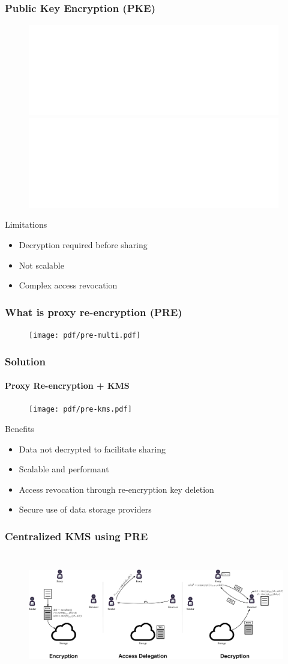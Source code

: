 \documentclass[xetex,mathsans,sans,aspectratio=169]{beamer}
\begin{document}
    \begin{frame}
        \frametitle{Public Key Encryption (PKE)}
        \begin{figure}
            \centering
            \includegraphics<1>[width=11cm]{pdf/pke-multi.pdf}
            \includegraphics<2>[width=11cm]{pdf/pke-multi-hack.pdf}
        \end{figure}

        Limitations
        \begin{itemize}
            \item Decryption required before sharing
            \item Not scalable
            \item Complex access revocation
        \end{itemize}
    \end{frame}

    \begin{frame}
        \frametitle{What is proxy re-encryption (PRE)}
        \begin{figure}
            \centering
            \texttt{[image: pdf/pre-multi.pdf]}
        \end{figure}
    \end{frame}

    \begin{frame}
        \frametitle{Solution}
        \framesubtitle{Proxy Re-encryption + KMS}
        \begin{figure}
            \centering
            \texttt{[image: pdf/pre-kms.pdf]}
        \end{figure}

        Benefits
        \begin{itemize}
            \item Data not decrypted to facilitate sharing
            \item Scalable and performant
            \item Access revocation through re-encryption key deletion
            \item Secure use of data storage providers
        \end{itemize}
    \end{frame}

    \begin{frame}
        \frametitle{Centralized KMS using PRE}
        \begin{figure}
            \centering
            \includegraphics[height=5.4cm]{pdf/centralized-consolidated.pdf}
        \end{figure}
    \end{frame}
\end{document}
